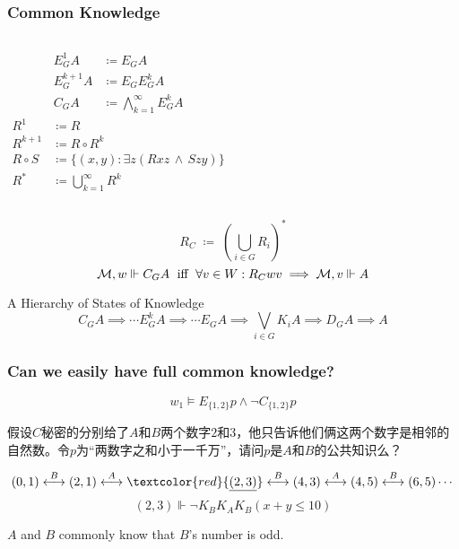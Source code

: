 \documentclass[UTF8,11pt,colorlinks,compress,openany]{beamer}%
\begin{document}
\begin{frame}\frametitle{Common Knowledge}
		\begin{columns}
				\begin{align*}
				E_G^1 A &\coloneqq E_G A\\
				E_G^{k+1} A &\coloneqq E_GE_G^k A\\
				C_G A &\coloneqq \bigwedge\limits_{k=1}^\infty E_G^k A
				\end{align*}
				\begin{align*}
				R^1&\coloneqq R\\
				R^{k+1}&\coloneqq R\circ R^k\\
				R\circ S&\coloneqq \{(x,y): \exists z(Rxz\,\wedge\,Szy)\}\\
				R^*&\coloneqq \bigcup\limits_{k=1}^\infty R^k
				\end{align*}
		\end{columns}
		\[R_C\;\coloneqq \;\left(\bigcup\limits_{i\in G}R_i\right)^*\]
		\[\mathcal{M},w\Vdash C_G A \mbox{\; iff \;} \forall v\in W: R_Cwv\implies\mathcal{M},v\Vdash A\]
	\begin{block}{A Hierarchy of States of Knowledge}
		\[C_G A\implies\cdots E_G^k A\implies\cdots E_G A\implies \bigvee\limits_{i\in G}K_i A\implies D_G A\implies A\]
	\end{block}
\end{frame}

\begin{frame}\frametitle{Can we easily have full common knowledge?}
\begin{center}
\end{center}
\[w_1\vDash E_{\{1,2\}}p\wedge\neg C_{\{1,2\}}p\]
\begin{block}{}
假设$C$秘密的分别给了$A$和$B$两个数字$2$和$3$，他只告诉他们俩这两个数字是相邻的自然数。令$p$为“两数字之和小于一千万”，请问$p$是$A$和$B$的公共知识么？
\end{block}
	\[(0,1)\stackrel{B}{\longleftrightarrow}(2,1)\stackrel{A}{\longleftrightarrow}\textcolor{red}{\underline{(2,3)}}\stackrel{B}{\longleftrightarrow}(4,3)\stackrel{A}{\longleftrightarrow}(4,5)\stackrel{B}{\longleftrightarrow}(6,5)\cdots\]
\[(2,3)\Vdash\neg K_BK_AK_B(x+y\leq 10)\]
\centerline{$A$ and $B$ commonly know that $B$'s number is odd.}
\end{frame}
\end{document}
